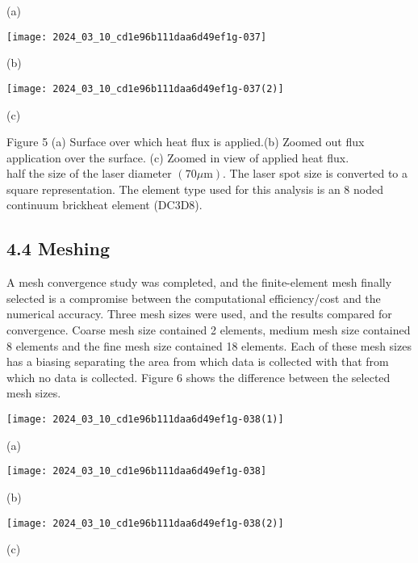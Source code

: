\documentclass[10pt]{article}
\begin{document}
(a)

\begin{center}
\texttt{[image: 2024\_03\_10\_cd1e96b111daa6d49ef1g-037]}
\end{center}

(b)

\begin{center}
\texttt{[image: 2024\_03\_10\_cd1e96b111daa6d49ef1g-037(2)]}
\end{center}

(c)

Figure 5 (a) Surface over which heat flux is applied.(b) Zoomed out flux application over the surface. (c) Zoomed in view of applied heat flux.\\
half the size of the laser diameter $(70 \mu \mathrm{m})$. The laser spot size is converted to a square representation. The element type used for this analysis is an 8 noded continuum brickheat element (DC3D8).

\subsection*{4.4 Meshing}
A mesh convergence study was completed, and the finite-element mesh finally selected is a compromise between the computational efficiency/cost and the numerical accuracy. Three mesh sizes were used, and the results compared for convergence. Coarse mesh size contained 2 elements, medium mesh size contained 8 elements and the fine mesh size contained 18 elements. Each of these mesh sizes has a biasing separating the area from which data is collected with that from which no data is collected. Figure 6 shows the difference between the selected mesh sizes.

\begin{center}
\texttt{[image: 2024\_03\_10\_cd1e96b111daa6d49ef1g-038(1)]}
\end{center}

(a)

\begin{center}
\texttt{[image: 2024\_03\_10\_cd1e96b111daa6d49ef1g-038]}
\end{center}

(b)

\begin{center}
\texttt{[image: 2024\_03\_10\_cd1e96b111daa6d49ef1g-038(2)]}
\end{center}

(c)
\end{document}
